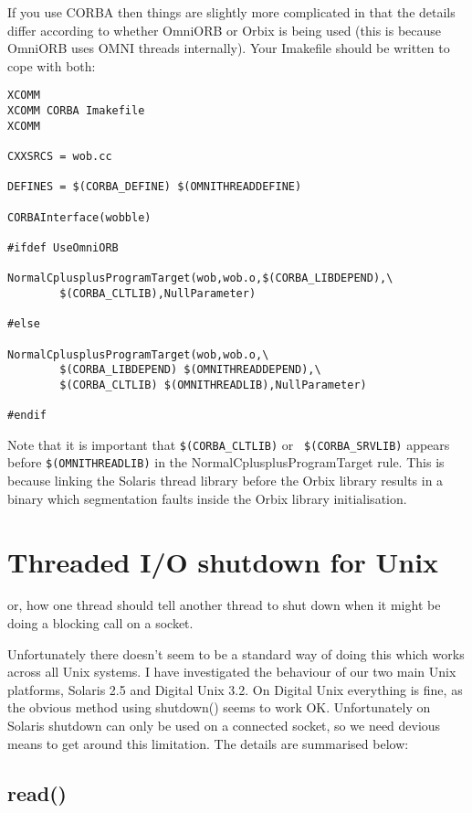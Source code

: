 \documentclass[11pt]{article}
\begin{document}
If you use CORBA then things are slightly more complicated in that the details
differ according to whether OmniORB or Orbix is being used (this is because
OmniORB uses OMNI threads internally).  Your Imakefile should be written to
cope with both:

\begin{verbatim}
XCOMM
XCOMM CORBA Imakefile
XCOMM

CXXSRCS = wob.cc

DEFINES = $(CORBA_DEFINE) $(OMNITHREADDEFINE)

CORBAInterface(wobble)

#ifdef UseOmniORB

NormalCplusplusProgramTarget(wob,wob.o,$(CORBA_LIBDEPEND),\
        $(CORBA_CLTLIB),NullParameter)

#else

NormalCplusplusProgramTarget(wob,wob.o,\
        $(CORBA_LIBDEPEND) $(OMNITHREADDEPEND),\
        $(CORBA_CLTLIB) $(OMNITHREADLIB),NullParameter)

#endif

\end{verbatim}

Note that it is important that {\tt \$(CORBA\_CLTLIB)} or {\tt
\$(CORBA\_SRVLIB)} appears before {\tt \$(OMNITHREADLIB)} in the
NormalCplusplusProgramTarget rule.  This is because linking the Solaris
thread library before the Orbix library results in a binary which segmentation
faults inside the Orbix library initialisation.



\section{Threaded I/O shutdown for Unix}

or, how one thread should tell another thread to shut down when it might
be doing a blocking call on a socket.

Unfortunately there doesn't seem to be a standard way of doing this which works
across all Unix systems.  I have investigated the behaviour of our two main
Unix platforms, Solaris 2.5 and Digital Unix 3.2.  On Digital Unix everything
is fine, as the obvious method using shutdown() seems to work OK.
Unfortunately on Solaris shutdown can only be used on a connected socket, so we
need devious means to get around this limitation.  The details are summarised
below:


\subsection{read()}
\end{document}
